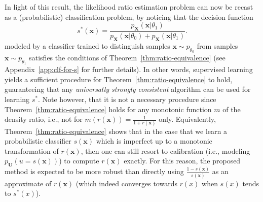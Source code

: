 \documentclass[12pt]{article}
\numberwithin{equation}{section}
\theoremstyle{plain}
\begin{document}

In light of this result, the likelihood ratio estimation problem can now
be recast as a (probabilistic) classification problem, by noticing that the decision
function
\begin{equation}\label{eqn:best-s-clf}
s^*(\mathbf{x}) = \frac{p_{\mathbf{X}}(\mathbf{x}|\theta_1)}{p_{\mathbf{X}}(\mathbf{x} | \theta_0) + p_{\mathbf{X}}(\mathbf{x} | \theta_1)}.
\end{equation}
modeled by a classifier trained to distinguish samples $\mathbf{x} \sim p_{\theta_0}$
from samples $\mathbf{x} \sim p_{\theta_1}$ satisfies the conditions of
Theorem~\ref{thm:ratio-equivalence} (see Appendix~\ref{app:clf-for-s} for further details).
In other words, supervised learning yields a sufficient
procedure for Theorem~\ref{thm:ratio-equivalence} to hold, guaranteeing that any
{\it universally strongly consistent} algorithm can be used for learning $s^*$.
Note however, that it is not a necessary procedure since
Theorem~\ref{thm:ratio-equivalence} holds for any monotonic function $m$ of the
density ratio, i.e., not for $m(r(\mathbf{x})) = \frac{1}{1 +
r(\mathbf{x})}$ only.
Equivalently,
Theorem~\ref{thm:ratio-equivalence} shows that in the case that we learn a probabilistic
classifier $s(\mathbf{x})$ which is imperfect up to a monotonic transformation
of $r(\mathbf{x})$, then one can still resort to calibration (i.e., modeling
$p_{\mathbf{U}}(u=s(\mathbf{x}))$) to compute $r(\mathbf{x})$ exactly.
For this reason, the proposed method is expected to be more robust than
directly using $\frac{1 - s(\mathbf{x})}{s(\mathbf{x})}$ as an approximate of
$r(\mathbf{x})$ (which indeed converges towards $r(x)$ when $s(x)$ tends to $s^*(x)$).
\end{document}
